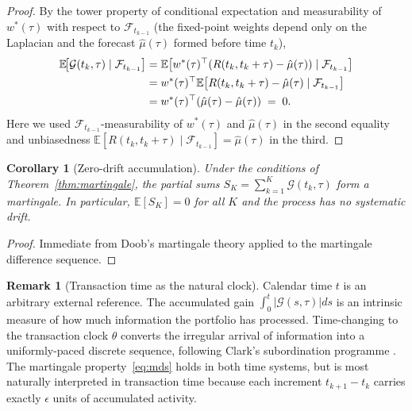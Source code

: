 \documentclass[twocolumn,11pt,a4paper]{article}
\theoremstyle{plain}
\newtheorem{corollary}[theorem]{Corollary}
\theoremstyle{definition}
\newtheorem{remark}[theorem]{Remark}
\theoremstyle{remark}
\newcommand{\E}{\mathbb{E}}
\newcommand{\F}{\mathcal{F}}
\newcommand{\wstar}{w^{*}}
\newcommand{\Gain}{\mathcal{G}}
\begin{document}
\begin{proof}
  By the tower property of conditional expectation and measurability
  of $\wstar(\tau)$ with respect to $\F_{t_{k-1}}$ (the fixed-point
  weights depend only on the Laplacian and the forecast $\hat\mu(\tau)$
  formed before time $t_k$),
  \begin{align}
    \E\!\bigl[\Gain(t_k,\tau)\mid\F_{t_{k-1}}\bigr]
    &= \E\!\left[\wstar(\tau)^{\top}(R(t_k,t_k+\tau)-\hat\mu(\tau))
       \mid\F_{t_{k-1}}\right] \notag\\
    &= \wstar(\tau)^{\top}
       \E\!\left[R(t_k,t_k+\tau)-\hat\mu(\tau)\mid\F_{t_{k-1}}\right]
       \notag\\
    &= \wstar(\tau)^{\top}(\hat\mu(\tau)-\hat\mu(\tau)) \;=\; 0.
    \label{eq:mds_proof}
  \end{align}
  Here we used $\F_{t_{k-1}}$-measurability of $\wstar(\tau)$ and
  $\hat\mu(\tau)$ in the second equality and unbiasedness
  $\E[R(t_k,t_k+\tau)\mid\F_{t_{k-1}}]=\hat\mu(\tau)$ in the third.
\end{proof}

\begin{corollary}[Zero-drift accumulation]
  \label{cor:zero_drift}
  Under the conditions of Theorem~\ref{thm:martingale}, the partial
  sums $S_K=\sum_{k=1}^K\Gain(t_k,\tau)$ form a martingale.  In
  particular, $\E[S_K]=0$ for all $K$ and the process has no
  systematic drift.
\end{corollary}

\begin{proof}
  Immediate from Doob's martingale theory \cite{Doob1953,Williams1991}
  applied to the martingale difference sequence.
\end{proof}

\begin{remark}[Transaction time as the natural clock]
  Calendar time $t$ is an arbitrary external reference.  The
  accumulated gain $\int_0^t|\Gain(s,\tau)|ds$ is an intrinsic
  measure of how much information the portfolio has processed.
  Time-changing to the transaction clock $\theta$ converts the
  irregular arrival of information into a uniformly-paced discrete
  sequence, following Clark's subordination programme \cite{Clark1973}.
  The martingale property~\eqref{eq:mds} holds in both time systems,
  but is most naturally interpreted in transaction time because each
  increment $t_{k+1}-t_k$ carries exactly $\epsilon$ units of
  accumulated activity.
\end{remark}
\end{document}
